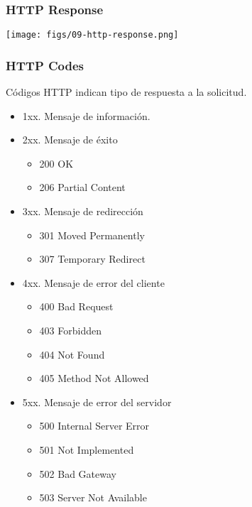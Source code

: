 \documentclass[letter]{beamer}
\begin{document}
\begin{frame}
  \frametitle{HTTP Response}
  
  \begin{center}
    \texttt{[image: figs/09-http-response.png]}
  \end{center}
  
\end{frame}


\begin{frame}
  \frametitle{HTTP Codes}

  Códigos HTTP indican tipo de respuesta a la solicitud.
  
  \begin{itemize}
    \item 1xx. Mensaje de información.
    \item 2xx. Mensaje de éxito
      \begin{itemize}
        \item 200 OK
        \item 206 Partial Content
      \end{itemize}
    \item 3xx. Mensaje de redirección
      \begin{itemize}
        \item 301 Moved Permanently
        \item 307 Temporary Redirect
      \end{itemize}
    \item 4xx. Mensaje de error del cliente
      \begin{itemize}
        \item 400 Bad Request
        \item 403 Forbidden
        \item 404 Not Found
        \item 405 Method Not Allowed
      \end{itemize}
    \item 5xx. Mensaje de error del servidor
      \begin{itemize}
        \item 500 Internal Server Error
        \item 501 Not Implemented
        \item 502 Bad Gateway
        \item 503 Server Not Available
      \end{itemize}
  \end{itemize}

\end{frame}
\end{document}
